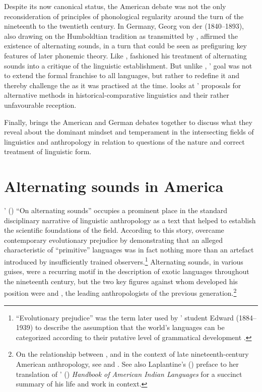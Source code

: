 \documentclass[output=paper]{langscibook}
\begin{document}
Despite its now canonical status, the American debate was not the only reconsideration of principles of phonological regularity around the turn of the nineteenth to the twentieth century. In Germany, Georg von der {\Gabelentz} (1840--1893), also drawing on the Humboldtian tradition as transmitted by {\Steinthal}, affirmed the existence of alternating sounds, in a turn that could be seen as prefiguring key features of later phonemic theory. Like {\Boas}, {\Gabelentz} fashioned his treatment of alternating sounds into a critique of the linguistic establishment. But unlike {\Boas}, {\Gabelentz}' goal was not to extend the formal franchise to all languages, but rather to redefine it and thereby challenge the  as it was practised at the time.  looks at {\Gabelentz}' proposals for alternative methods in historical-comparative linguistics and their rather unfavourable reception. 

Finally,  brings the American and German debates together to discuss what they reveal about the dominant mindset and temperament in the intersecting fields of linguistics and anthropology in relation to questions of the nature and correct treatment of linguistic form.

\section{Alternating sounds in America}
\label{sec:mcelvenny:america}

{\Boas}' (\citeyear{Boas1889}) ``On alternating sounds'' occupies a prominent place in the standard disciplinary narrative of linguistic anthropology as a text that helped to establish the scientific foundations of the field. According to this story, {\Boas} overcame contemporary evolutionary prejudice by demonstrating that an alleged characteristic of ``primitive'' languages was in fact nothing more than an artefact introduced by insufficiently trained observers.\footnote{``Evolutionary prejudice'' was the term later used by {\Boas}' student Edward {\Sapir} (1884--1939) to describe the assumption that the world's languages can be categorized according to their putative level of grammatical development \citep[see][130--132]{Sapir1921}.} Alternating sounds, in various guises, were a recurring motif in the description of exotic languages throughout the nineteenth century, but the two key figures against whom {\Boas} developed his position were {\Brinton} and {\Powell}, the leading anthropologists of the previous generation.\footnote{On the relationship between {\Boas}, {\Brinton} and {\Powell} in the context of late nineteenth-century American anthropology, see \citet{Darnell1988} and \citet{Darnell1998}. See also Laplantine's (\citeyear{Laplantine2018}) preface to her translation of {\Boas}' (\citeyear{Boas1911}) \emph{Handbook of American Indian Languages} for a succinct summary of his life and work in context.}
\end{document}
